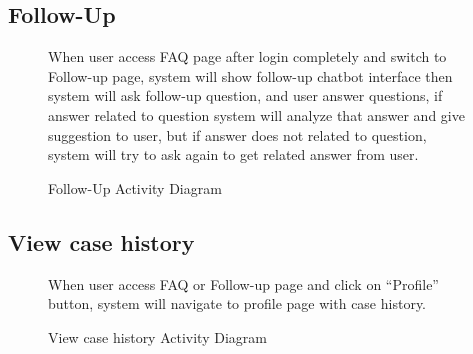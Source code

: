\documentclass[12pt,oneside,openright,a4paper]{cpe-english-project}
\begin{document}
      \subsection{Follow-Up}
      \begin{figure}[!h]
        \centering
        \caption{Follow-Up Activity Diagram}\label{fig:AD_Follow}
        \begin{flushleft}
          \qquad When user access FAQ page after login completely and switch to Follow-up page, system will show follow-up chatbot interface then system will ask follow-up question, and user answer questions, if answer related to question system will analyze that answer and give suggestion to user, but if answer does not related to question, system will try to ask again to get related answer from user.  \par
        \end{flushleft}
      \end{figure}
\newpage
      \subsection{View case history}
      \begin{figure}[!h]
        \centering
        \caption{View case history Activity Diagram}\label{fig:AD_ViewCase}
        \begin{flushleft}
          \qquad When user access FAQ or Follow-up page and click on “Profile” button, system will navigate to profile page with case history.  \par
        \end{flushleft}
      \end{figure}
\end{document}
